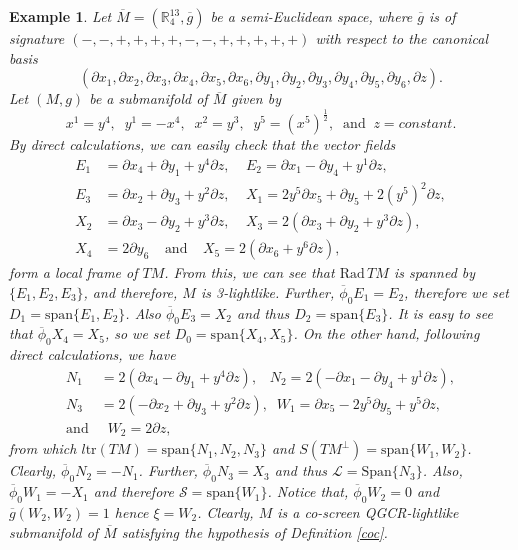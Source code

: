 \documentclass[reqno, 12pt]{amsart}
\numberwithin{equation}{section}
\newtheorem{example}[theorem]{Example}
\begin{document}
 \begin{example}\label{exa11}
{\rm
Let $\overline{M}=(\mathbb{R}_4^{13}, \overline{g})$ be a semi-Euclidean space,  where $\overline{g}$ is of signature $(-,-,+,+,+,+, - ,  -,+,+,+,+,+)$ with respect to the canonical basis
\begin{equation*}
 (\partial x_{1},\partial x_{2},\partial x_{3},\partial x_{4},\partial x_{5},\partial x_{6},\partial y_{1},\partial y_{2},\partial y_{3},\partial y_{4},\partial y_{5},\partial y_{6},\partial z).
\end{equation*}
Let $(M,g)$ be a submanifold of $\overline{M}$ given by 
\begin{equation*}
 x^{1}=y^{4},\;\; y^{1}=-x^{4},\;\; x^{2}= y^{3},\;\; y^5=(x^5)^{\frac{1}{2}}, \;\;\mbox{and}\;\;z=constant.
 \end{equation*}
 By direct calculations, we can easily check that the vector fields
\begin{align*} 
 E_{1} & = \partial x_{4}+\partial y_{1}+y^4\partial z,\;\;\;\; E_{2}=\partial x_{1}-\partial y_{4}+y^1\partial z,\\
 E_{3} & = \partial x_{2} + \partial y_{3} + y^{2} \partial z, \;\;\;\; X_{1}=2y^{5}\partial x_{5}+\partial y_{5}+2(y^5)^{2}\partial z,\\ 
 X_{2} & = \partial x_{3} - \partial y_{2}+y^{3}\partial z,\;\;\;\;  X_{3}=2(\partial x_{3} + \partial y_{2} + y^{3} \partial z),\\
 X_{4} & = 2\partial y_{6}\;\;\;\;\mbox{and}\;\;\;\; X_{5}=2(\partial x_{6}+y^{6}\partial z),
\end{align*}
form a local frame of $TM$. From this, we can see that $\mathrm{Rad} \, TM$ is spanned by $\{E_{1}, E_{2}, E_{3}\}$, and therefore, $M$ is 3-lightlike. Further, $\overline{\phi}_{0} E_{1}=E_{2}$, therefore we set $D_{1}=\mbox{span}\{E_{1},E_2\}$. Also $\overline{\phi}_{0} E_{3}=X_{2}$ and thus $D_{2}=\mathrm{span}\{E_{3}\}$. It is easy to see that $\overline{\phi}_{0} X_{4}=X_{5}$, so we set $D_{0}=\mathrm{span}\{X_{4},X_{5}\}$. On the other hand, following direct calculations, we have 
\begin{align} 
 N_{1} & =2(\partial x_{4}-\partial y_{1}+y^{4}\partial z),\;\; \;  N_{2}=2(-\partial x_{1}-\partial y_{4}+y^{1}\partial z),\nonumber\\
 N_{3} & =2(- \partial x_{2} + \partial y_{3} + y^{2} \partial z),\;\;  W_{1}=\partial x_{5}-2y^{5}\partial y_{5}+y^{5}\partial z,\nonumber\\
 \mbox{and}&\;\; W_{2}=2\partial z, \nonumber
\end{align}
from which $l\mathrm{tr}(TM)=\mathrm{span}\{N_{1},N_{2},N_{3}\}$ and $S(TM^{\perp})=\mathrm{span}\{W_{1}, W_{2}\}$. Clearly, $\overline{\phi}_{0} N_{2}=-N_{1}$. Further, $\overline{\phi}_{0} N_{3}= X_{3}$ and thus $\mathcal{L}=\mbox{Span}\{N_3\}$. Also, $\overline{\phi}_{0} W_{1}=-X_{1}$ and therefore $\mathcal{S}=\mbox{span}\{W_{1}\}$. Notice that, $\overline{\phi}_{0}W_{2}=0$ and $\overline{g}(W_{2},W_{2})=1$ hence $\xi=W_{2}$. Clearly, $M$ is a co-screen QGCR-lightlike submanifold of $\overline{M}$ satisfying the hypothesis of Definition \ref{coc}.
}
\end{example}
\end{document}
